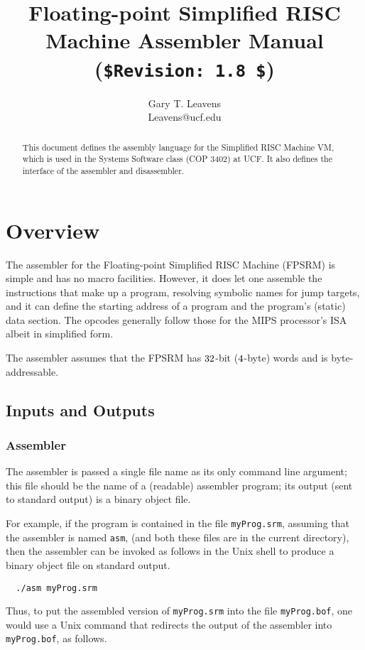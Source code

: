 \documentclass[11pt,letterpaper]{article}
\title{Floating-point Simplified RISC Machine Assembler Manual \\
       (\lstinline!$Revision: 1.8 $!)}
\author{Gary T. Leavens \\
        Leavens@ucf.edu}
\begin{document}
\maketitle
\begin{abstract}
This document defines the assembly language for the
Simplified RISC Machine VM, which is used in the Systems Software
class (COP 3402) at UCF.
It also defines the interface of the assembler and disassembler.
\end{abstract}

\section{Overview}

The assembler for the Floating-point Simplified RISC Machine (FPSRM)
is simple and has
no macro facilities. However, it does let one assemble the
instructions that make up a program, resolving symbolic names for jump targets,
and it can define the starting
address of a program and the program's (static) data section.
The opcodes generally follow those for the MIPS processor's ISA
\cite{Kane-Heinrich92} albeit in simplified form.

The assembler assumes that the FPSRM has $32$-bit ($4$-byte)
words and is byte-addressable.

\subsection{Inputs and Outputs}

\subsubsection{Assembler}

The assembler is passed a single file name as its only command line argument;
this file should be the name of a (readable) assembler program;
its output (sent to standard output) is a binary object file.

For example, if the program is contained in the file
\texttt{myProg.srm}, assuming that the assembler is named \texttt{asm},
(and both these files are in the current directory), then the assembler
can be invoked as follows in the Unix shell to produce a binary object file on standard output.
\begin{lstlisting}
  ./asm myProg.srm
\end{lstlisting}

Thus, to put the assembled version of \texttt{myProg.srm} into the file \texttt{myProg.bof},
one would use a Unix command that redirects the output of the assembler into \texttt{myProg.bof}, as follows.
\end{document}
